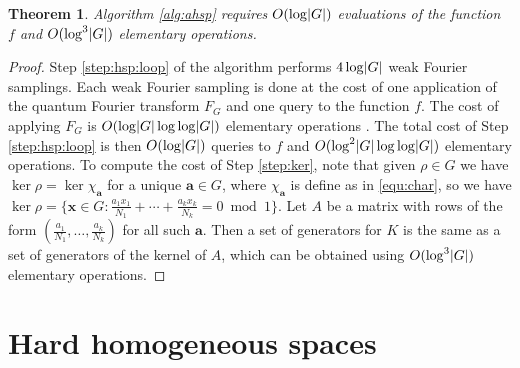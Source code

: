 \documentclass[11pt]{article}
\theoremstyle{plain}
\newtheorem{theorem}{Theorem}[section]
\theoremstyle{definition}
\DeclarePairedDelimiter{\abs}{\lvert}{\rvert}
\begin{document}
\begin{theorem}
	\label{thm:ahsp-time}
	Algorithm \ref{alg:ahsp} requires $O(\log \abs{G})$ evaluations of the function $f$ and 
	$O(\log^3 \abs{G})$ elementary operations.
\end{theorem}
\begin{proof}
	Step \ref{step:hsp:loop} of the algorithm performs $4\log \abs{G}$ weak Fourier samplings. Each 
	weak Fourier sampling is done at the cost of one application of the quantum Fourier transform 
	$F_G$ and one query to the function $f$. The cost of applying $F_G$ is $O(\log \abs{G} \log\log 
	\abs{G})$ elementary operations \cite{cleve1998quantum}. The total cost of Step 
	\ref{step:hsp:loop} is then $O(\log \abs{G})$ queries to $f$ and $O(\log^2 \abs{G} \log\log 
	\abs{G})$ elementary operations. To compute the cost of Step \ref{step:ker}, note that given 
	$\rho \in \hat{G}$ we have $\ker \rho = \ker \chi_{\bm{a}}$ for a unique $\bm{a} \in G$, where  
	$\chi_{\bm{a}}$ is define as in \eqref{equ:char}, so we have $\ker \rho = \{ \bm{x} \in G: 
	\frac{a_1x_1}{N_1} + \cdots + \frac{a_kx_k}{N_k} = 0 \bmod 1 \}$. Let $A$ be a matrix with rows 
	of the form $(\frac{a_1}{N_1}, \dots, \frac{a_k}{N_k})$ for all such $\bm{a}$. Then a set of 
	generators for $K$ is the same as a set of generators of the kernel of $A$, which can be 
	obtained using $O(\log^3 \abs{G})$ elementary operations.
\end{proof}




\section{Hard homogeneous spaces}
\label{sec:hhs}
\end{document}
